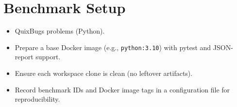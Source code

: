 \section{Benchmark Setup}

\begin{itemize}
    \item QuixBugs problems (Python).
    \item Prepare a base Docker image (e.g., \texttt{python:3.10}) with pytest and JSON-report support.
    \item Ensure each workspace clone is clean (no leftover artifacts).
    \item Record benchmark IDs and Docker image tags in a configuration file for reproducibility.
\end{itemize}
